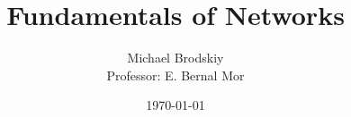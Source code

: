 


\title{Fundamentals of Networks}
\date{\today}
\author{Michael Brodskiy\\ \small Professor: E. Bernal Mor}



\maketitle


